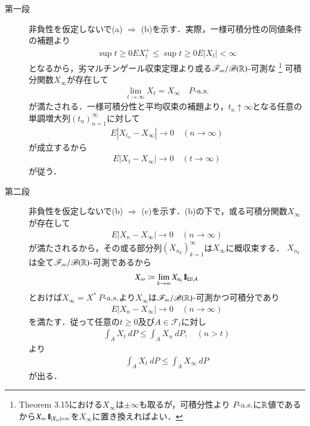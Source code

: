 	\begin{prf}\mbox{}
		\begin{description}
			\item[第一段]
				非負性を仮定しないで(a) $\Rightarrow$ (b)を示す．実際，一様可積分性の同値条件の補題より
				\begin{align}
					\sup{t \geq 0}{EX_t^+} \leq \sup{t \geq 0}{E|X_t|} < \infty
				\end{align}
				となるから，劣マルチンゲール収束定理より或る$\mathscr{F}_\infty/\mathscr{B}(\mathbb{R})$-可測な
				\footnote{
					Theorem 3.15における$X_\infty$は$\pm \infty$も取るが，可積分性より
					$P$-a.s.に$\mathbb{R}$値であるから$X_\infty \mbox{1}\hspace{-0.25em}\mbox{l}_{|X_\infty|<\infty}$を$X_\infty$に置き換えればよい．
				}
				可積分関数$X_\infty$が存在して
				\begin{align}
					\lim_{t \to \infty} X_t = X_\infty
					\quad \mbox{$P$-a.s.}
				\end{align}
				が満たされる．一様可積分性と平均収束の補題より，$t_n \uparrow \infty$となる任意の単調増大列$(t_n)_{n=1}^\infty$に対して
				\begin{align}
					E|X_{t_n} - X_\infty| \longrightarrow 0
					\quad (n \longrightarrow \infty)
				\end{align}
				が成立するから
				\begin{align}
					E|X_t - X_\infty| \longrightarrow 0
					\quad (t \longrightarrow \infty)
				\end{align}
				が従う．
			
			\item[第二段]
				非負性を仮定しないで(b) $\Rightarrow$ (c)を示す．(b)の下で，或る可積分関数$X_\infty$が存在して
				\begin{align}
					E|X_n - X_\infty| \longrightarrow 0
					\quad (n \longrightarrow \infty)
				\end{align}
				が満たされるから，その或る部分列$\left( X_{n_k} \right)_{k=1}^\infty$は$X_\infty$に概収束する．
				$X_{n_k}$は全て$\mathscr{F}_\infty/\mathscr{B}(\mathbb{R})$-可測であるから
				\begin{align}
					X_\infty \coloneqq \lim_{k \to \infty} X_{n_k} \mbox{1}\hspace{-0.25em}\mbox{l}_{\Omega \backslash A}
				\end{align}
				とおけば$X_\infty = X^*\ \mbox{$P$-a.s.}$より$X_\infty$は$\mathscr{F}_\infty/\mathscr{B}(\mathbb{R})$-可測かつ可積分であり
				\begin{align}
					E|X_n - X_\infty| \longrightarrow 0
					\quad (n \longrightarrow \infty)
				\end{align}
				を満たす．従って任意の$t \geq 0$及び$A \in \mathscr{F}_t$に対し
				\begin{align}
					\int_A X_t\ dP \leq \int_A X_n\ dP,
					\quad (n > t)
					\label{eq:chapter_1_Problem_3_19_1}
				\end{align}
				より
				\begin{align}
					\int_A X_t\ dP \leq \int_A X_\infty\ dP
					\label{eq:chapter_1_Problem_3_19_2}
				\end{align}
				が出る．
				

\end{description}
\end{prf}

